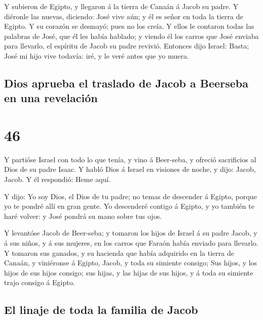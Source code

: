  Y subieron de Egipto, y llegaron á la tierra de Canaán á
Jacob su padre.  Y diéronle las nuevas, diciendo: José
vive aún; y él es señor en toda la tierra de Egipto. Y su corazón se
desmayó; pues no los creía.  Y ellos le contaron todas
las palabras de José, que él les había hablado; y viendo él los carros
que José enviaba para llevarlo, el espíritu de Jacob su padre revivió.
 Entonces dijo Israel: Basta; José mi hijo vive todavía:
iré, y le veré antes que yo muera.

\hypertarget{dios-aprueba-el-traslado-de-jacob-a-beerseba-en-una-revelaciuxf3n}{%
\subsection{Dios aprueba el traslado de Jacob a Beerseba en una
revelación}\label{dios-aprueba-el-traslado-de-jacob-a-beerseba-en-una-revelaciuxf3n}}

\hypertarget{section-01-46}{%
\section{46}\label{section-01-46}}

 Y partióse Israel con todo lo que tenía, y vino á
Beer-seba, y ofreció sacrificios al Dios de su padre Isaac.
 Y habló Dios á Israel en visiones de noche, y dijo:
Jacob, Jacob. Y él respondió: Heme aquí.

 Y dijo: Yo soy Dios, el Dios de tu padre; no temas de
descender á Egipto, porque yo te pondré allí en gran gente.
 Yo descenderé contigo á Egipto, y yo también te haré
volver: y José pondrá su mano sobre tus ojos.

 Y levantóse Jacob de Beer-seba; y tomaron los hijos de
Israel á su padre Jacob, y á sus niños, y á sus mujeres, en los carros
que Faraón había enviado para llevarlo.  Y tomaron sus
ganados, y su hacienda que había adquirido en la tierra de Canaán, y
viniéronse á Egipto, Jacob, y toda su simiente consigo; 
Sus hijos, y los hijos de sus hijos consigo; sus hijas, y las hijas de
sus hijos, y á toda su simiente trajo consigo á Egipto.

\hypertarget{el-linaje-de-toda-la-familia-de-jacob}{%
\subsection{El linaje de toda la familia de
Jacob}\label{el-linaje-de-toda-la-familia-de-jacob}}

